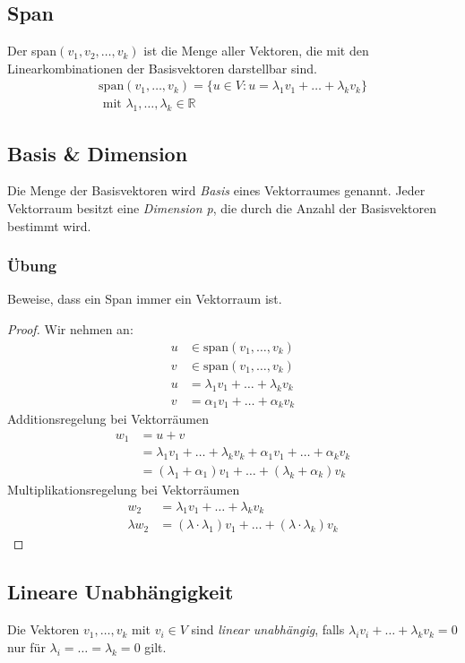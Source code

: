 \subsection{Span}
Der span$(v_1, v_2,\dots,v_k)$ ist die Menge aller Vektoren, die mit den Linearkombinationen der Basisvektoren darstellbar sind.
\begin{align*}
\text{span}(v_1,\dots,v_k) = \{u \in V : u = \lambda_1v_1+\dots+\lambda_kv_k\} \\
\text{ mit } \lambda_1,\dots,\lambda_k \in \mathbb{R}
\end{align*}

\subsection{Basis \& Dimension}
Die Menge der Basisvektoren wird \textit{Basis} eines Vektorraumes genannt. Jeder Vektorraum besitzt eine \textit{Dimension p}, die durch die Anzahl der Basisvektoren bestimmt wird.

\subsubsection*{\"Ubung}
Beweise, dass ein Span immer ein Vektorraum ist.
\begin{proof}
Wir nehmen an: 
\begin{align*}
u &\in \text{span}(v_1,\dots,v_k)\\
v &\in \text{span}(v_1,\dots,v_k)\\
u &= \lambda_1v_1+\dots+\lambda_k v_k\\
v &= \alpha_1v_1+\dots+\alpha_k v_k
\end{align*}
Additionsregelung bei Vektorr\"aumen
\begin{align*}
	w_1 &= u+v\\
	&=\lambda_1 v_1+\dots+\lambda_k v_k+\alpha_1 v_1+\dots+\alpha_k v_k \\
	&=(\lambda_1+\alpha_1) v_1+\dots+(\lambda_k+\alpha_k) v_k
\end{align*}
Multiplikationsregelung bei Vektorr\"aumen 
\begin{align*}
	w_2 &= \lambda_1 v_1+\dots+\lambda_k v_k\\
	\lambda w_2 &= (\lambda \cdot \lambda_1) v_1+\dots+(\lambda \cdot \lambda_k)v_k
\end{align*}
\end{proof}

\subsection{Lineare Unabh\"angigkeit}
Die Vektoren $v_1,\dots,v_k$ mit $v_i \in V$ sind \textit{linear unabh\"angig}, falls $\lambda_iv_i+\dots+\lambda_kv_k = 0$ nur f\"ur $\lambda_i=\dots=\lambda_k= 0$ gilt. 

%
